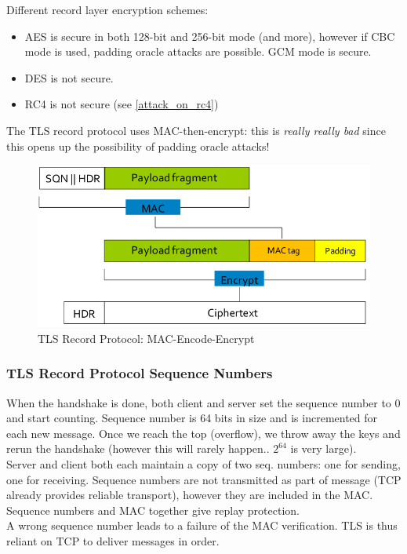 \documentclass[11pt,oneside,a4paper]{article}
\begin{document}
\noindent Different record layer encryption schemes:

\vspace{-\topsep}
\begin{itemize}
	\setlength{\itemsep}{0pt}
	\setlength{\parskip}{0pt}
	\item AES is secure in both 128-bit and 256-bit mode (and more), however if CBC mode is used, padding oracle attacks are possible. GCM mode is secure.
	\item DES is not secure.
	\item RC4 is not secure (see \ref{attack_on_rc4})
\end{itemize}
\vspace{-\topsep}

\noindent The TLS record protocol uses MAC-then-encrypt: this is \textit{really really bad} since this opens up the possibility of padding oracle attacks!

\begin{figure}[hb]
	\centering
	\includegraphics[width=0.4\linewidth]{figures/tls_record_protocol}
	\caption{TLS Record Protocol: MAC-Encode-Encrypt}
	\label{fig:tlsrecordprotocol}
\end{figure}

\subsubsection{TLS Record Protocol Sequence Numbers}

When the handshake is done, both client and server set the sequence number to 0 and start counting. Sequence number is 64 bits in size and is incremented for each new message. Once we reach the top (overflow), we throw away the keys and rerun the handshake (however this will rarely happen.. $2^{64}$ is very large).\\
Server and client both each maintain a copy of two seq. numbers: one for sending, one for receiving. Sequence numbers are not transmitted as part of message (TCP already provides reliable transport), however they are included in the MAC. Sequence numbers and MAC together give replay protection.\\
A wrong sequence number leads to a failure of the MAC verification. TLS is thus reliant on TCP to deliver messages in order.
\end{document}
